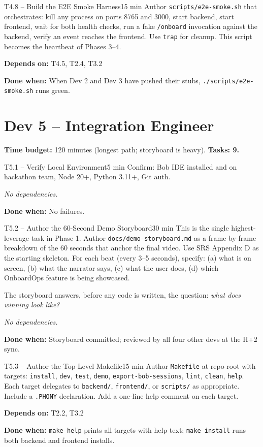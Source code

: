 \documentclass[11pt,letterpaper]{article}
\newcommand{\acceptance}[1]{\par\smallskip\textcolor{ibmgreen}{\textbf{Done when:}} #1}
\newcommand{\depends}[1]{\par\smallskip\textcolor{ibmorange}{\textbf{Depends on:}} #1}
\newcommand{\nodep}{\par\smallskip\textcolor{ibmgray}{\textit{No dependencies.}}}
\begin{document}
\begin{task}{T4.8 -- Build the E2E Smoke Harness}{15 min}
Author \texttt{scripts/e2e-smoke.sh} that orchestrates: kill any process on ports 8765 and 3000, start backend, start frontend, wait for both health checks, run a fake \texttt{/onboard} invocation against the backend, verify an event reaches the frontend. Use \texttt{trap} for cleanup. This script becomes the heartbeat of Phases 3--4.
\depends{T4.5, T2.4, T3.2}
\acceptance{When Dev 2 and Dev 3 have pushed their stubs, \texttt{./scripts/e2e-smoke.sh} runs green.}
\end{task}

\section{Dev 5 -- Integration Engineer}

\textbf{Time budget:} 120 minutes (longest path; storyboard is heavy). \textbf{Tasks: 9.}

\begin{task}{T5.1 -- Verify Local Environment}{5 min}
Confirm: Bob IDE installed and on hackathon team, Node 20+, Python 3.11+, Git auth.
\nodep
\acceptance{No failures.}
\end{task}

\begin{task}{T5.2 -- Author the 60-Second Demo Storyboard}{30 min}
This is the single highest-leverage task in Phase 1. Author \texttt{docs/demo-storyboard.md} as a frame-by-frame breakdown of the 60 seconds that anchor the final video. Use SRS Appendix D as the starting skeleton. For each beat (every 3--5 seconds), specify: (a) what is on screen, (b) what the narrator says, (c) what the user does, (d) which OnboardOps feature is being showcased.

The storyboard answers, before any code is written, the question: \textit{what does winning look like?}
\nodep
\acceptance{Storyboard committed; reviewed by all four other devs at the H+2 sync.}
\end{task}

\begin{task}{T5.3 -- Author the Top-Level Makefile}{15 min}
Author \texttt{Makefile} at repo root with targets: \texttt{install}, \texttt{dev}, \texttt{test}, \texttt{demo}, \texttt{export-bob-sessions}, \texttt{lint}, \texttt{clean}, \texttt{help}. Each target delegates to \texttt{backend/}, \texttt{frontend/}, or \texttt{scripts/} as appropriate. Include a \texttt{.PHONY} declaration. Add a one-line help comment on each target.
\depends{T2.2, T3.2}
\acceptance{\texttt{make help} prints all targets with help text; \texttt{make install} runs both backend and frontend installs.}
\end{task}
\end{document}
